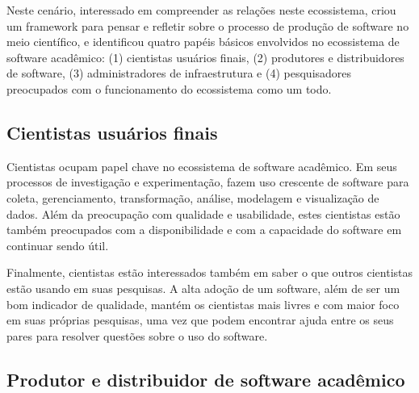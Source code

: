 
Neste cenário, interessado em compreender as relações neste ecossistema,
 criou um framework para pensar e refletir
sobre o processo de produção de software no meio científico, e identificou quatro
papéis básicos envolvidos no ecossistema de software acadêmico: 
(1) cientistas usuários finais, (2) produtores e distribuidores de software, (3)
administradores de infraestrutura e (4) pesquisadores preocupados com o
funcionamento do ecossistema como um todo.

\subsection{Cientistas usuários finais}

Cientistas ocupam papel chave no ecossistema de software acadêmico.
Em seus processos de investigação e experimentação, fazem uso crescente 
de software para coleta, gerenciamento, transformação, análise, modelagem e
visualização de dados. 
Além da preocupação com qualidade e usabilidade,
estes cientistas estão também preocupados com a disponibilidade e com a
capacidade do software em continuar sendo útil.

Finalmente, cientistas estão interessados também em saber o que outros 
cientistas estão usando em suas pesquisas. A alta adoção de um software, 
além de ser um bom indicador de qualidade, mantém os cientistas mais livres 
e com maior foco em suas próprias pesquisas, uma vez que podem encontrar
ajuda entre os seus pares para resolver questões sobre o uso do software.



\subsection{Produtor e distribuidor de software acadêmico}

